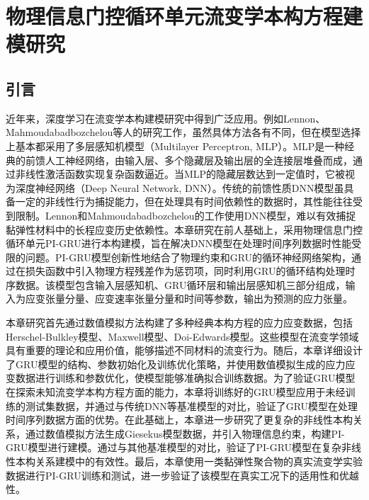 \chapter{物理信息门控循环单元流变学本构方程建模研究}
\section{引言}
近年来，深度学习在流变学本构建模研究中得到广泛应用。例如Lennon、Mahmoudabadbozchelou等人的研究工作，虽然具体方法各有不同，但在模型选择上基本都采用了多层感知机模型（Multilayer Perceptron, MLP）\cite{lennonScientificMachineLearning2023a,mahmoudabadbozchelouDatadrivenPhysicsinformedConstitutive2021}。MLP是一种经典的前馈人工神经网络，由输入层、多个隐藏层及输出层的全连接层堆叠而成，通过非线性激活函数实现复杂函数逼近。当MLP的隐藏层数达到一定值时，它被视为深度神经网络（Deep Neural Network, DNN）。传统的前馈性质DNN模型虽具备一定的非线性行为捕捉能力，但在处理具有时间依赖性的数据时，其性能往往受到限制。Lennon和Mahmoudabadbozchelou的工作使用DNN模型，难以有效捕捉黏弹性材料中的长程应变历史依赖性。本章研究在前人基础上，采用物理信息门控循环单元PI-GRU进行本构建模，旨在解决DNN模型在处理时间序列数据时性能受限的问题。PI-GRU模型创新性地结合了物理约束和GRU的循环神经网络架构，通过在损失函数中引入物理方程残差作为惩罚项，同时利用GRU的循环结构处理时序数据。该模型包含输入层感知机、GRU循环层和输出层感知机三部分组成，输入为应变张量分量、应变速率张量分量和时间等参数，输出为预测的应力张量。

本章研究首先通过数值模拟方法构建了多种经典本构方程的应力应变数据，包括Herschel-Bulkley模型、Maxwell模型、Doi-Edwards模型。这些模型在流变学领域具有重要的理论和应用价值，能够描述不同材料的流变行为。随后，本章详细设计了GRU模型的结构、参数初始化及训练优化策略，并使用数值模拟生成的应力应变数据进行训练和参数优化，使模型能够准确拟合训练数据。为了验证GRU模型在探索未知流变学本构方程方面的能力，本章将训练好的GRU模型应用于未经训练的测试集数据，并通过与传统DNN等基准模型的对比，验证了GRU模型在处理时间序列数据方面的优势。在此基础上，本章进一步研究了更复杂的非线性本构关系，通过数值模拟方法生成Giesekus模型数据，并引入物理信息约束，构建PI-GRU模型进行建模。通过与其他基准模型的对比，验证了PI-GRU模型在复杂非线性本构关系建模中的有效性。最后，本章使用一类黏弹性聚合物的真实流变学实验数据进行PI-GRU训练和测试，进一步验证了该模型在真实工况下的适用性和优越性。
